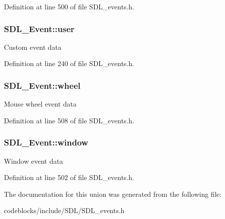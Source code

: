 Definition at line 500 of file S\+D\+L\+\_\+events.\+h.

\hypertarget{unionSDL__Event_ab7c394e3ce7bf1e4f8d68bc0e9f1b042}{
\subsubsection[{user}]{ S\+D\+L\+\_\+\+Event\+::user}}\label{unionSDL__Event_ab7c394e3ce7bf1e4f8d68bc0e9f1b042}
Custom event data 

Definition at line 240 of file S\+D\+L\+\_\+events.\+h.

\hypertarget{unionSDL__Event_a267d3f550715519ec90a81ccd0e6cbda}{
\subsubsection[{wheel}]{ S\+D\+L\+\_\+\+Event\+::wheel}}\label{unionSDL__Event_a267d3f550715519ec90a81ccd0e6cbda}
Mouse wheel event data 

Definition at line 508 of file S\+D\+L\+\_\+events.\+h.

\hypertarget{unionSDL__Event_a826936b3275406d857bc6654669fae71}{
\subsubsection[{window}]{ S\+D\+L\+\_\+\+Event\+::window}}\label{unionSDL__Event_a826936b3275406d857bc6654669fae71}
Window event data 

Definition at line 502 of file S\+D\+L\+\_\+events.\+h.



The documentation for this union was generated from the following file\+:\begin{DoxyCompactItemize}
\item 
codeblocks/include/\+S\+D\+L/S\+D\+L\+\_\+events.\+h\end{DoxyCompactItemize}
